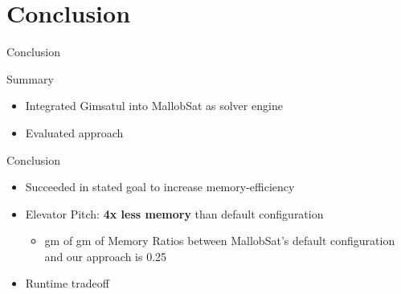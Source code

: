 \documentclass[]{sdqbeamer}
\begin{document}

\section{Conclusion}
\begin{frame}{Conclusion}
    \begin{block}{Summary}
        \begin{itemize}
            \item Integrated Gimsatul into MallobSat as solver engine
            \item Evaluated approach
        \end{itemize}
    \end{block}

    \begin{block}{Conclusion}
        \begin{itemize}
            \item Succeeded in stated goal to increase memory-efficiency
            \item Elevator Pitch: \textbf{4x less memory} than default configuration
            \begin{itemize}
                \item gm of gm of Memory Ratios between MallobSat's default configuration and our approach is 0.25
            \end{itemize}
            \item Runtime tradeoff
        \end{itemize}
    \end{block}
\end{frame}
\end{document}
